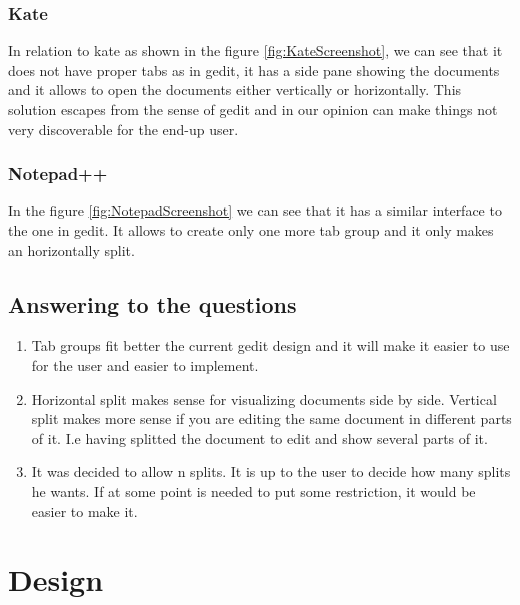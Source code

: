 \subsubsection{Kate}

In relation to kate as shown in the figure \ref{fig:KateScreenshot}, we can see that it does not have proper tabs as in gedit, it has a side pane showing the documents and it allows to open the documents either vertically or horizontally. This solution escapes from the sense of gedit and in our opinion can make things not very discoverable for the end-up user.

\subsubsection{Notepad++}

In the figure \ref{fig:NotepadScreenshot} we can see that it has a similar interface to the one in gedit. It allows to create only one more tab group and it only makes an horizontally split.

\newpage
{}


\newpage
{}

\subsection{Answering to the questions}

\begin{enumerate}
  \item Tab groups fit better the current gedit design and it will make it easier to use for the user and easier to implement.
  \item Horizontal split makes sense for visualizing documents side by side. Vertical split makes more sense if you are editing the same document in different parts of it. I.e having splitted the document to edit and show several parts of it.
  \item It was decided to allow n splits. It is up to the user to decide how many splits he wants. If at some point is needed to put some restriction, it would be easier to make it.
\end{enumerate}

\newpage

\section{Design}

